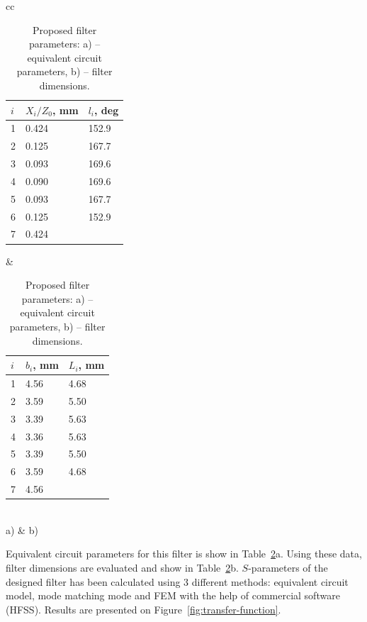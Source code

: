 \documentclass{pj}
\begin{document}
\begin{table}

  \begin{tabular}{cc}
  \begin{tabular}{|l|l|l|}
    \hline
    $i$ & $X_i/Z_0$, mm & $l_i$, deg \\ \hline
    1 & 0.424 & 152.9 \\ \hline
    2 & 0.125 & 167.7 \\ \hline
    3 & 0.093 & 169.6 \\ \hline
    4 & 0.090 & 169.6 \\ \hline
    5 & 0.093 & 167.7 \\ \hline
    6 & 0.125 & 152.9 \\ \hline
    7 & 0.424 & \\ \hline
  \end{tabular} &
  \begin{tabular}{|l|l|l|}
    \hline
    $i$ & $b_i$, mm & $L_i$, mm \\ \hline
    1 & 4.56 & 4.68 \\ \hline
    2 & 3.59 & 5.50 \\ \hline
    3 & 3.39 & 5.63 \\ \hline
    4 & 3.36 & 5.63 \\ \hline
    5 & 3.39 & 5.50 \\ \hline
    6 & 3.59 & 4.68 \\ \hline
    7 & 4.56 & \\ \hline
  \end{tabular} \\
    a) & b) 
  \end{tabular}
  \caption{Proposed filter parameters: a) -- equivalent circuit
    parameters, b) -- filter dimensions.}
  \label{tab:filter_dimensions}
\end{table}

Equivalent circuit parameters for this filter is show in
Table~\ref{tab:filter_dimensions}a. Using these data, filter
dimensions are evaluated and show in
Table~\ref{tab:filter_dimensions}b. $S$-parameters of the designed
filter has been calculated using 3 different methods: equivalent
circuit model, mode matching mode and FEM with the help of commercial
software (HFSS). Results are presented on
Figure~\ref{fig:transfer-function}.
\end{document}
